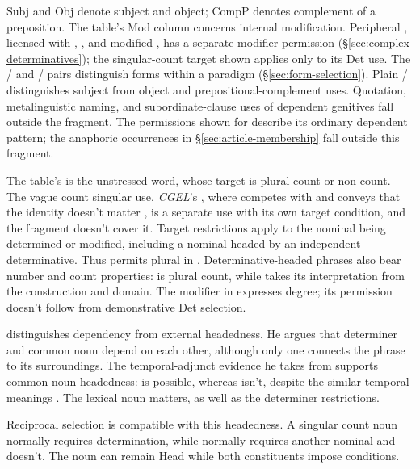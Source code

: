 \documentclass[12pt]{article}
\begin{document}
Subj and Obj denote subject and object; CompP denotes complement of a preposition. The table's Mod column concerns internal modification. Peripheral , licensed with , , and modified , has a separate modifier permission (§\ref{sec:complex-determinatives}); the singular-count target shown applies only to its Det use. The / and / pairs distinguish forms within a paradigm (§\ref{sec:form-selection}). Plain / distinguishes subject from object and prepositional-complement uses. Quotation, metalinguistic naming, and subordinate-clause uses of dependent genitives fall outside the fragment. The permissions shown for  describe its ordinary dependent pattern; the anaphoric occurrences in §\ref{sec:article-membership} fall outside this fragment.

The table's  is the unstressed word, whose target is plural count or non-count. The vague count singular use, \textit{CGEL}'s , where  competes with  and conveys that the identity doesn't matter \citep[380]{huddleston2002}, is a separate use with its own target condition, and the fragment doesn't cover it. Target restrictions apply to the nominal being determined or modified, including a nominal headed by an independent determinative. Thus  permits plural  in . Determinative-headed phrases also bear number and count properties:  is plural count, while  takes its interpretation from the construction and domain. The modifier  in  expresses degree; its permission doesn't follow from demonstrative Det selection.

\textcite[7--8]{hudson2004determiners} distinguishes dependency from external headedness. He argues that determiner and common noun depend on each other, although only one connects the phrase to its surroundings. The temporal-adjunct evidence he takes from \textcite{vanlangendonck1994} supports common-noun headedness:  is possible, whereas  isn't, despite the similar temporal meanings \citep[10--12]{hudson2004determiners}. The lexical noun matters, as well as the determiner restrictions.

Reciprocal selection is compatible with this headedness. A singular count noun normally requires determination, while  normally requires another nominal and  doesn't. The noun can remain Head while both constituents impose conditions.
\end{document}
